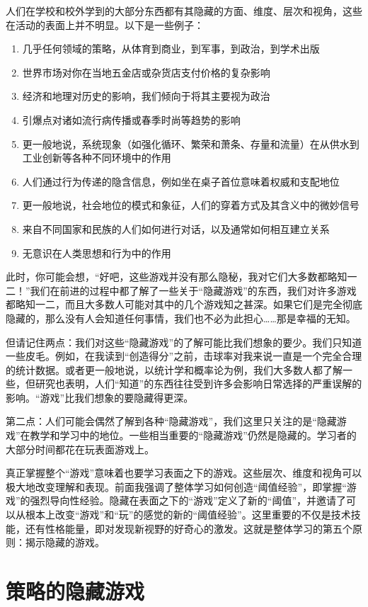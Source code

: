 人们在学校和校外学到的大部分东西都有其隐藏的方面、维度、层次和视角，这些在活动的表面上并不明显。以下是一些例子：
\begin{enumerate}
    \item 几乎任何领域的策略，从体育到商业，到军事，到政治，到学术出版
    \item 世界市场对你在当地五金店或杂货店支付价格的复杂影响
    \item 经济和地理对历史的影响，我们倾向于将其主要视为政治
    \item 引爆点对诸如流行病传播或春季时尚等趋势的影响
    \item 更一般地说，系统现象（如强化循环、繁荣和萧条、存量和流量）在从供水到工业创新等各种不同环境中的作用
    \item 人们通过行为传递的隐含信息，例如坐在桌子首位意味着权威和支配地位
    \item 更一般地说，社会地位的模式和象征，人们的穿着方式及其含义中的微妙信号
    \item 来自不同国家和民族的人们如何进行对话，以及通常如何相互建立关系
    \item 无意识在人类思想和行为中的作用
\end{enumerate}

此时，你可能会想，“好吧，这些游戏并没有那么隐秘，我对它们大多数都略知一二！”我们在前进的过程中都了解了一些关于“隐藏游戏”的东西，我们对许多游戏都略知一二，而且大多数人可能对其中的几个游戏知之甚深。如果它们是完全彻底隐藏的，那么没有人会知道任何事情，我们也不必为此担心……那是幸福的无知。

但请记住两点：我们对这些“隐藏游戏”的了解可能比我们想象的要少。我们只知道一些皮毛。例如，在我读到“创造得分”之前，击球率对我来说一直是一个完全合理的统计数据。或者更一般地说，以统计学和概率论为例，我们大多数人都了解一些，但研究也表明，人们“知道”的东西往往受到许多会影响日常选择的严重误解的影响。“游戏”比我们想象的要隐藏得更深。

第二点：人们可能会偶然了解到各种“隐藏游戏”，我们这里只关注的是“隐藏游戏”在教学和学习中的地位。一些相当重要的“隐藏游戏”仍然是隐藏的。学习者的大部分时间都花在玩表面游戏上。

真正掌握整个“游戏”意味着也要学习表面之下的游戏。这些层次、维度和视角可以极大地改变理解和表现。前面我强调了整体学习如何创造“阈值经验”，即掌握“游戏”的强烈导向性经验。隐藏在表面之下的“游戏”定义了新的“阈值”，并邀请了可以从根本上改变“游戏”和“玩”的感觉的新的“阈值经验”。这里重要的不仅是技术技能，还有性格能量，即对发现新视野的好奇心的激发。这就是整体学习的第五个原则：揭示隐藏的游戏。

\section*{策略的隐藏游戏}

